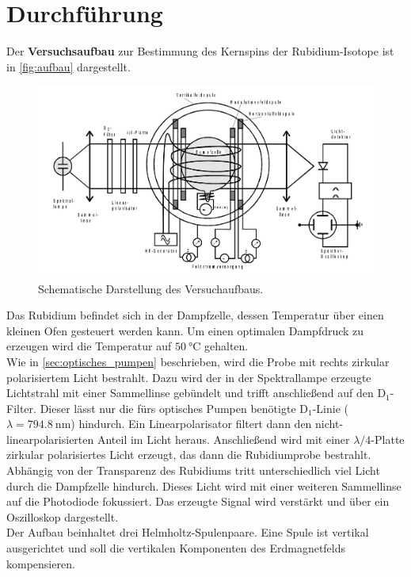 \section{Durchführung}
\label{sec:Durchführung}
Der \textbf{Versuchsaufbau} zur Bestimmung des Kernspins der Rubidium-Isotope ist in \autoref{fig:aufbau} dargestellt.
\begin{figure}
    \centering
    \includegraphics[width=\textwidth]{content/img/aufbau.png}
    \caption{Schematische Darstellung des Versuchaufbaus. \cite{anleitung}}
    \label{fig:aufbau}
\end{figure}
Das Rubidium befindet sich in der Dampfzelle, dessen Temperatur über einen kleinen Ofen gesteuert werden kann.
Um einen optimalen Dampfdruck zu erzeugen wird die Temperatur auf $\qty{50}{\degreeCelsius}$ gehalten.
\\
Wie in \autoref{sec:optisches_pumpen} beschrieben, wird die Probe mit rechts zirkular polarisiertem Licht bestrahlt.
Dazu wird der in der Spektrallampe erzeugte Lichtstrahl mit einer Sammellinse gebündelt und trifft anschließend auf den $\text{D}_1$-Filter.
Dieser lässt nur die fürs optisches Pumpen benötigte $\text{D}_1$-Linie ($\lambda = \qty{794.8}{\nano\metre}$) hindurch.
Ein Linearpolarisator filtert dann den nicht-linearpolarisierten Anteil im Licht heraus.
Anschließend wird mit einer $\lambda / 4$-Platte zirkular polarisiertes Licht erzeugt, das dann die Rubidiumprobe bestrahlt.
\\
Abhängig von der Transparenz des Rubidiums tritt unterschiedlich viel Licht durch die Dampfzelle hindurch.
Dieses Licht wird mit einer weiteren Sammellinse auf die Photodiode fokussiert.
Das erzeugte Signal wird verstärkt und über ein Oszilloskop dargestellt.
\\
Der Aufbau beinhaltet drei Helmholtz-Spulenpaare.
Eine Spule ist vertikal ausgerichtet und soll die vertikalen Komponenten des Erdmagnetfelds kompensieren.
